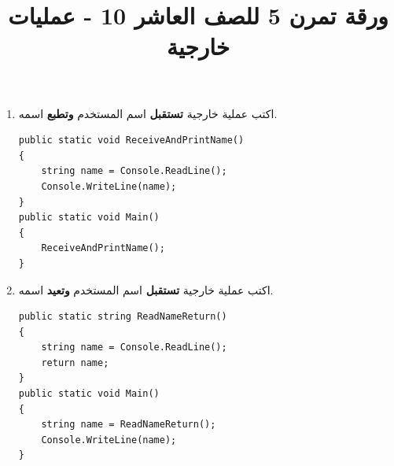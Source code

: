 ﻿\documentclass[12pt]{article}
\title{ورقة تمرن 5 للصف العاشر 10 - عمليات خارجية}
\begin{document}
\maketitle
\thispagestyle{fancy}

\ifwithsols
\begin{enumerate}[itemsep=3em]
\else
\begin{enumerate}
\fi


\begin{boxAttention}
    \begin{itemize}
\item عندما يٌطلب "عملية خارجية \textbf{تستقبل}" يجب ان يكون المستخدم يدخل قيمة للمتغير. أي عليك استعمال \texttt{Console.ReadLine()}.

\item أما عندما يُطلب منك "عملية خارجية \textbf{تتلقى}" فهذا يعني أنّها تتلقى المطلوب كبارمترات.

\item عندما يُطلب منك كتابة "برنامج" فهذا يعني كتابة داخل \texttt{Main()}.

\item إذا كانت العملية تعيد قيمة ما، فعليك حفظ القيمة التي تعيدها في متغير عند استدعائها. \\
أما إذا كانت لا تعيد أي قيمة، فإنّك تكتب اسمها فقط عند استدعائها، وتعطيها بارمتراتها إن وجدت.

\end{itemize}
\end{boxAttention}

\item اكتب عملية خارجية \textbf{تستقبل} اسم المستخدم \textbf{وتطبع} اسمه.
\ifwithsols
\begin{boxSolution}
\begin{english}
\begin{verbatim}
public static void ReceiveAndPrintName()
{
    string name = Console.ReadLine();
    Console.WriteLine(name);
}
public static void Main()
{
    ReceiveAndPrintName();
}
\end{verbatim}
\end{english}
\end{boxSolution}
\clearpage
\fi


\item اكتب عملية خارجية \textbf{تستقبل} اسم المستخدم \textbf{وتعيد} اسمه.
\ifwithsols
\begin{boxSolution}
\begin{english}
\begin{verbatim}
public static string ReadNameReturn()
{
    string name = Console.ReadLine();
    return name;
}
public static void Main()
{
    string name = ReadNameReturn();
    Console.WriteLine(name);
}
\end{verbatim}
\end{english}
\end{boxSolution}
\fi



\end{enumerate}
\end{enumerate}
\end{document}
